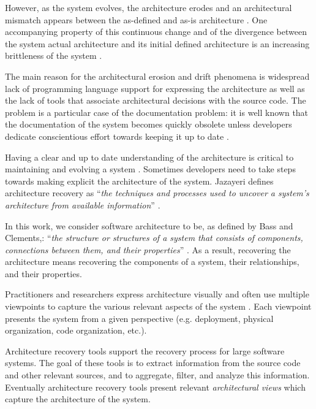 \documentclass[preprint,12pt]{elsarticle}
\begin{document}
However, as the system evolves, the architecture erodes \cite{perry-foundations} and an architectural mismatch appears between the as-defined and as-is architecture \cite{garlan-mismatch}.
One accompanying property of this continuous change and of the divergence between the system actual architecture and its initial defined architecture is an increasing brittleness of the system \cite{perry-foundations}.

The main reason for the architectural erosion and drift phenomena is widespread lack of programming language support for expressing the architecture as well as the lack of tools that associate architectural decisions with the source code. The problem is a particular case of the documentation problem: it is well known that the documentation of the system becomes quickly obsolete unless developers dedicate conscientious effort towards keeping it up to date \cite{riva-report}.

Having a clear and up to date understanding of the architecture is critical to maintaining and evolving a system \cite{pollet-sar}. Sometimes developers need to take steps towards making explicit the architecture of the system. Jazayeri defines architecture recovery as ``{\em the techniques and processes used to uncover a system’s architecture from available information}'' \cite{jaza-archevo}.


In this work, we consider software architecture to be, as defined by Bass and Clements,: ``{\em the structure or structures of a system that consists of components, connections between them, and their properties}'' \cite{bass-architecture}. 
As a result, recovering the architecture means recovering the components of a system, their relationships, and their properties. 

Practitioners and researchers express architecture visually and often use multiple viewpoints to capture the various relevant aspects of the system \cite{kruchten-4plus}. Each viewpoint presents the system from a given perspective (e.g. deployment, physical organization, code organization, etc.).


Architecture recovery tools support the recovery process for large software systems. The goal of these tools is to extract information from the source code and other relevant sources, and to aggregate, filter, and analyze this information. Eventually architecture recovery tools present relevant {\em architectural views} which capture the architecture of the system. 
\end{document}
